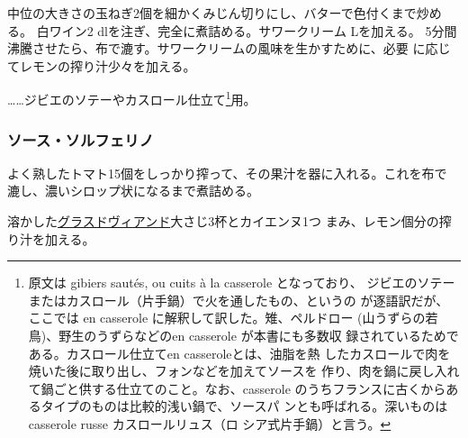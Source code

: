 \begin{recette}

中位の大きさの玉ねぎ2個を細かくみじん切りにし、バターで色付くまで炒める。
白ワイン2 dlを注ぎ、完全に煮詰める。サワークリーム\undemi{} Lを加える。
5分間沸騰させたら、布で漉す。サワークリームの風味を生かすために、必要
に応じてレモンの搾り汁少々を加える。

\ldots{}\ldots{}ジビエのソテーやカスロール仕立て\footnote{原文は gibiers
  sautés, ou cuits à la casserole となっており、
  ジビエのソテーまたはカスロール（片手鍋）で火を通したもの、というの
  が逐語訳だが、ここでは en casserole に解釈して訳した。雉、ペルドロー
  (山うずらの若鳥)、野生のうずらなどのen casserole が本書にも多数収
  録されているためである。カスロール仕立てen casseroleとは、油脂を熱
  したカスロールで肉を焼いた後に取り出し、フォンなどを加えてソースを
  作り、肉を鍋に戻し入れて鍋ごと供する仕立てのこと。なお、casserole
  のうちフランスに古くからあるタイプのものは比較的浅い鍋で、ソースパ
  ンとも呼ばれる。深いものはcasserole russe カスロールリュス（ロ
  シア式片手鍋）と言う。}用。

\maeaki

\hypertarget{sauce-solferino}{%
\subsubsection{ソース・ソルフェリノ}\label{sauce-solferino}}



よく熟したトマト15個をしっかり搾って、その果汁を器に入れる。これを布で
漉し、濃いシロップ状になるまで煮詰める。

溶かした\protect\hyperlink{glace-de-viande}{グラスドヴィアンド}大さじ3杯とカイエンヌ1つ
まみ、レモン\undemi{}個分の搾り汁を加える。


\end{recette}
